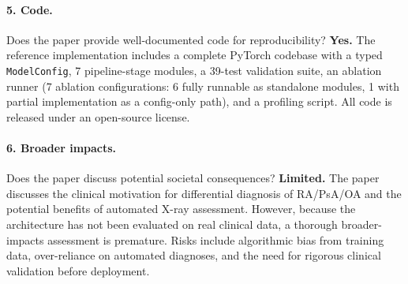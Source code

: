 \documentclass{article}
\begin{document}
\paragraph{5. Code.}
Does the paper provide well-documented code for reproducibility?
\textbf{Yes.} The reference implementation includes a complete PyTorch codebase with a typed \texttt{ModelConfig}, 7 pipeline-stage modules, a 39-test validation suite, an ablation runner (7 ablation configurations: 6 fully runnable as standalone modules, 1 with partial implementation as a config-only path), and a profiling script. All code is released under an open-source license.

\paragraph{6. Broader impacts.}
Does the paper discuss potential societal consequences?
\textbf{Limited.} The paper discusses the clinical motivation for differential diagnosis of RA/PsA/OA and the potential benefits of automated X-ray assessment. However, because the architecture has not been evaluated on real clinical data, a thorough broader-impacts assessment is premature. Risks include algorithmic bias from training data, over-reliance on automated diagnoses, and the need for rigorous clinical validation before deployment.
\end{document}
